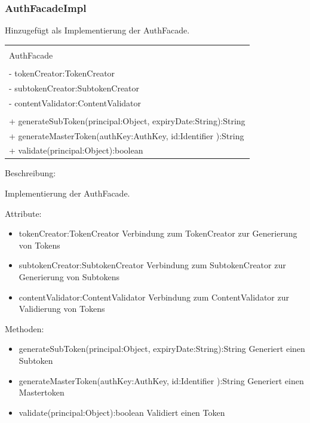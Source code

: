 \documentclass[a4paper,20pt,oneside]{book}
\begin{document}
	\subsubsection{AuthFacadeImpl}
	
	Hinzugefügt als Implementierung der AuthFacade.	
	
	\vspace{0.5cm}
	\centering
	\begin{tabular}{|l|}
	\hline \\
	AuthFacade \\ \hline \\
	-  tokenCreator:TokenCreator\\
	- subtokenCreator:SubtokenCreator \\
	- contentValidator:ContentValidator 
	\\ \hline \\
	+ generateSubToken(principal:Object, expiryDate:String):String\\ 
   + generateMasterToken(authKey:AuthKey, id:Identifier ):String\\
   + validate(principal:Object):boolean
 \\ \hline
	\end{tabular}
		 
	\vspace{0.5cm}
	\raggedright
	Beschreibung:
	
	Implementierung der AuthFacade.
	
	\vspace{0.5cm}
	Attribute:
	\begin{itemize}
	\item tokenCreator:TokenCreator\linebreak
	Verbindung zum TokenCreator zur Generierung von Tokens
	\item subtokenCreator:SubtokenCreator\linebreak
	Verbindung zum SubtokenCreator zur Generierung von Subtokens
	\item contentValidator:ContentValidator \linebreak
	Verbindung zum ContentValidator zur Validierung von Tokens
	\end{itemize}
	
	Methoden:
	\begin{itemize}
	\item generateSubToken(principal:Object, expiryDate:String):String\linebreak
	Generiert einen Subtoken
	\item generateMasterToken(authKey:AuthKey, id:Identifier ):String\linebreak
	Generiert einen Mastertoken
	\item validate(principal:Object):boolean\linebreak
	Validiert einen Token
	\end{itemize}
	
\end{document}
